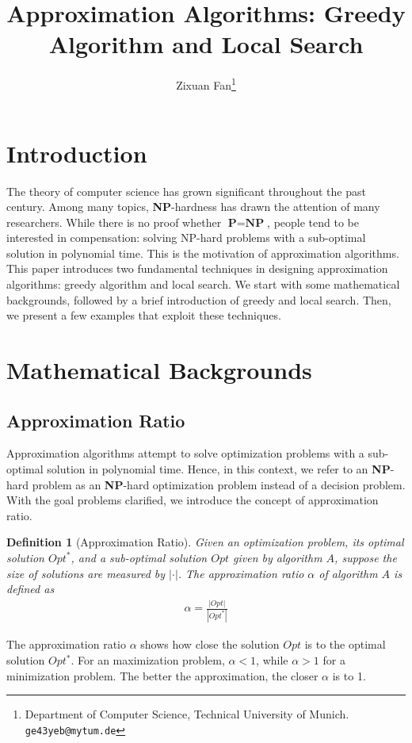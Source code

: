 \documentclass[11pt,psfig,times]{article}
\newcommand*{\PTIME}{\textbf{P}}
\newcommand*{\NP}{\textbf{NP}}
\newtheorem{definition}[theorem]{Definition}
\begin{document}
\title{Approximation Algorithms: Greedy Algorithm and Local Search}
\author{Zixuan Fan\thanks{Department of Computer Science, Technical University of Munich. {\tt ge43yeb@mytum.de}}}
\maketitle

\section{Introduction}
The theory of computer science has grown significant throughout the past century. Among many topics, \NP-hardness has drawn the attention of many researchers. 
While there is no proof whether $\PTIME=\NP$, people tend to be interested in compensation: solving NP-hard problems with a sub-optimal solution in polynomial time.
This is the motivation of approximation algorithms. This paper introduces two fundamental techniques in designing approximation algorithms: greedy algorithm and local search.
We start with some mathematical backgrounds, followed by a brief introduction of greedy and local search. 
Then, we present a few examples that exploit these techniques.

\section{Mathematical Backgrounds}
\subsection{Approximation Ratio}
Approximation algorithms attempt to solve optimization problems with a sub-optimal solution in polynomial time. 
Hence, in this context, we refer to an \NP-hard problem as an \NP-hard optimization problem instead of a decision problem. 
With the goal problems clarified, we introduce the concept of approximation ratio.
\begin{definition}[Approximation Ratio]
    Given an optimization problem, its optimal solution $Opt^*$, and a sub-optimal solution $Opt$ given by algorithm $A$, suppose the size of solutions 
    are measured by $|\cdot|$. The approximation ratio $\alpha$ of algorithm $A$ is defined as 
    \begin{align*}
        \alpha = \frac{|Opt|}{|Opt^*|}
    \end{align*}
\end{definition}
The approximation ratio $\alpha$ shows how close the solution $Opt$ is to the optimal solution $Opt^*$. For an maximization problem, $\alpha < 1$, while $\alpha > 1$
for a minimization problem. The better the approximation, the closer $\alpha$ is to 1.
\end{document}
